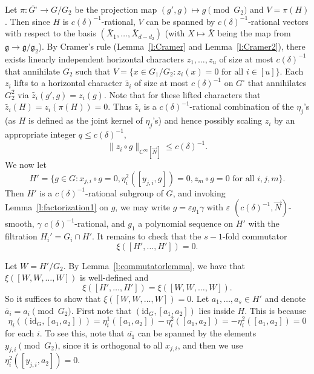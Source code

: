\documentclass[11pt, a4paper]{amsart}
\theoremstyle{plain}
\newcommand{\eps}{\varepsilon}
\theoremstyle{plain}
\theoremstyle{definition}
\theoremstyle{remark}
\numberwithin{equation}{section}
\numberwithin{lemma}{section}
\numberwithin{proposition}{section}
\numberwithin{corollary}{section}
\numberwithin{definition}{section}
\numberwithin{claim}{section}
\begin{document}
Let $\pi\colon \overline{G^\square} \to G/G_2$ be the projection map $(g', g) \mapsto g \pmod{G_2}$ and $V = \pi(H)$. Then since $H$ is $c(\delta)^{-1}$-rational, $V$ can be spanned by $c(\delta)^{-1}$-rational vectors with respect to the basis $(\bar{X}_1, \dots, \bar{X}_{d - d_2})$ (with $X \mapsto \bar{X}$ being the map from $\mathfrak{g} \to \mathfrak{g}/\mathfrak{g}_2$). By Cramer's rule (Lemma~\ref{l:Cramer} and Lemma~\ref{l:Cramer2}), there exists linearly independent horizontal characters $z_1, \dots, z_u$ of size at most $c(\delta)^{-1}$ that annihilate $G_2$ such that $V = \{x \in G_1/G_2: z_i(x) = 0 \text{ for all } i \in [u]\}$. Each $z_i$ lifts to a horizontal character $\tilde{z_i}$ of size at most $c(\delta)^{-1}$ on $G^\square$ that annihilates $G_2^2$ via $\tilde{z_i}(g', g) = z_i(g)$. Note that for these lifted characters that $\tilde{z_i}(H) = z_i(\pi(H)) = 0$. Thus $\tilde{z_i}$ is a $c(\delta)^{-1}$-rational combination of the $\eta_j$'s (as $H$ is defined as the joint kernel of $\eta_j$'s) and hence possibly scaling $z_i$ by an appropriate integer $q \le c(\delta)^{-1}$,
$$\|z_i \circ g\|_{C^\infty[\vec{N}]} \le c(\delta)^{-1}.$$
We now let 
$$H' = \{g \in G: x_{j, i} \circ g = 0 , \eta_i^2([y_{j, i}, g]) = 0, z_m \circ g = 0 \text{ for all } i, j, m\}.$$
Then $H'$ is a $c(\delta)^{-1}$-rational subgroup of $G$, and invoking Lemma~\ref{l:factorization1} on $g$, we may write $g = \eps g_1\gamma$ with $\eps$ $(c(\delta)^{-1}, \vec{N})$-smooth, $\gamma$ $c(\delta)^{-1}$-rational, and $g_1$ a polynomial sequence on $H'$ with the filtration $H_i' = G_i \cap H'$. It remains to check that the $s - 1$-fold commutator
$$\xi([H', \dots, H']) = 0.$$

Let $W = H'/G_2$. By Lemma~\ref{l:commutatorlemma}, we have that $\xi([W, W, \dots, W])$ is well-defined and 
$$\xi([H', \dots, H']) = \xi([W, W, \dots, W]).$$ 
So it suffices to show that $\xi([W, W, \dots, W]) = 0$. Let $a_1, \dots, a_s \in H'$ and denote $\overline{a}_i = a_i \pmod{G_2}$. First note that $(\mathrm{id}_G,[a_{1}, a_2])$ lies inside $H$. This is because 
$$\eta_i((\mathrm{id}_G, [a_1, a_2])) = \eta_i^1([a_1, a_2]) - \eta_i^2([a_1, a_2]) = -\eta_i^2([a_{1}, a_2]) = 0$$
for each $i$. To see this, note that $\overline{a_1}$ can be spanned by the elements $y_{j, i} \pmod{G_2}$, since it is orthogonal to all $x_{j,i}$, and then we use $\eta_i^2([y_{j,i},a_{2}]) = 0$.
\end{document}
